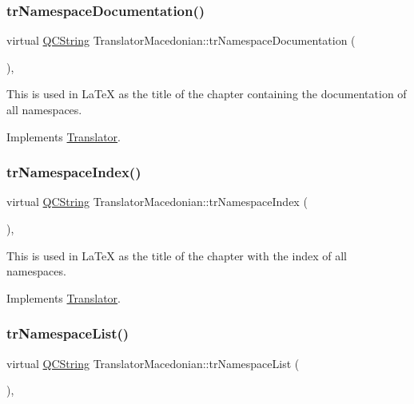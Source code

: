 \subsubsection{\texorpdfstring{trNamespaceDocumentation()}{trNamespaceDocumentation()}}
{\footnotesize\ttfamily virtual \mbox{\hyperlink{class_q_c_string}{Q\+C\+String}} Translator\+Macedonian\+::tr\+Namespace\+Documentation (\begin{DoxyParamCaption}{ }\end{DoxyParamCaption})\hspace{0.3cm}{\ttfamily [inline]}, {\ttfamily [virtual]}}

This is used in La\+TeX as the title of the chapter containing the documentation of all namespaces. 

Implements \mbox{\hyperlink{class_translator}{Translator}}.

\mbox{\label{class_translator_macedonian_afdb883847bccf55e3b30dfff202b84da}} 
\subsubsection{\texorpdfstring{trNamespaceIndex()}{trNamespaceIndex()}}
{\footnotesize\ttfamily virtual \mbox{\hyperlink{class_q_c_string}{Q\+C\+String}} Translator\+Macedonian\+::tr\+Namespace\+Index (\begin{DoxyParamCaption}{ }\end{DoxyParamCaption})\hspace{0.3cm}{\ttfamily [inline]}, {\ttfamily [virtual]}}

This is used in La\+TeX as the title of the chapter with the index of all namespaces. 

Implements \mbox{\hyperlink{class_translator}{Translator}}.

\mbox{\label{class_translator_macedonian_a3fe9b781c35256c864f602603475be9d}} 
\subsubsection{\texorpdfstring{trNamespaceList()}{trNamespaceList()}}
{\footnotesize\ttfamily virtual \mbox{\hyperlink{class_q_c_string}{Q\+C\+String}} Translator\+Macedonian\+::tr\+Namespace\+List (\begin{DoxyParamCaption}{ }\end{DoxyParamCaption})\hspace{0.3cm}{\ttfamily [inline]}, {\ttfamily [virtual]}}

